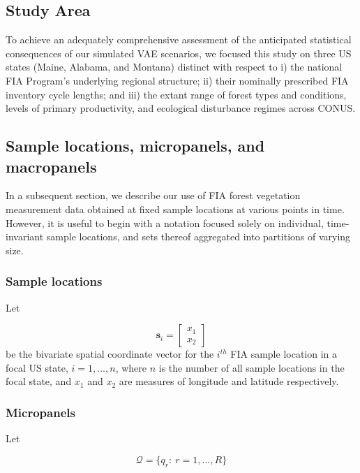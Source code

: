 \documentclass[
  number]{elsarticle}
\begin{document}
\subsection{Study Area}\label{study-area}

To achieve an adequately comprehensive assessment of the anticipated
statistical consequences of our simulated VAE scenarios, we focused this
study on three US states (Maine, Alabama, and Montana) distinct with
respect to i) the national FIA Program's underlying regional structure;
ii) their nominally prescribed FIA inventory cycle lengths; and iii) the
extant range of forest types and conditions, levels of primary
productivity, and ecological disturbance regimes across CONUS.

\subsection{Sample locations, micropanels, and
macropanels}\label{sample-locations-micropanels-and-macropanels}

In a subsequent section, we describe our use of FIA forest vegetation
measurement data obtained at fixed sample locations at various points in
time. However, it is useful to begin with a notation focused solely on
individual, time-invariant sample locations, and sets thereof aggregated
into partitions of varying size.

\subsubsection{Sample locations}\label{sample-locations}

Let

\[\mathbf{s}_i = \begin{bmatrix} x_1 \\ x_2 \end{bmatrix}\] be the
bivariate spatial coordinate vector for the \(i^{th}\) FIA sample
location in a focal US state, \(i = 1,\ldots,n\), where \(n\) is the
number of all sample locations in the focal state, and \(x_1\) and
\(x_2\) are measures of longitude and latitude respectively.

\subsubsection{Micropanels}\label{micropanels}

Let

\[\mathcal{Q} = \{q_r : \ r=1, \ldots, R\}\]
\end{document}
